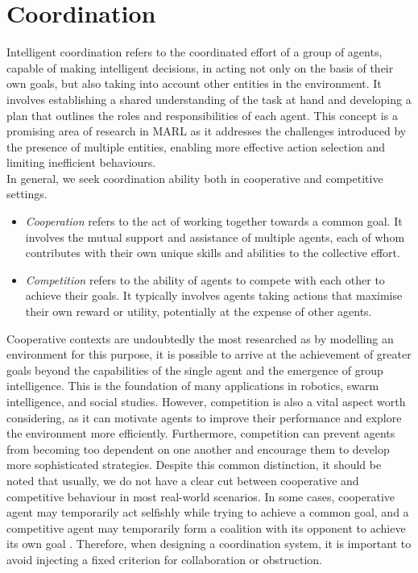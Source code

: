 \documentclass[a4paper,singleside,12pt]{report} %
\begin{document}
\section{Coordination}\label{coordination}

Intelligent coordination refers to the coordinated effort of a group of agents, capable of making intelligent decisions, in acting not only on the basis of their own goals, but also taking into account other entities in the environment. It involves establishing a shared understanding of the task at hand and developing a plan that outlines the roles and responsibilities of each agent. This concept is a promising area of research in MARL as it addresses the challenges introduced by the presence of multiple entities, enabling more effective action selection and limiting inefficient behaviours.\\
In general, we seek coordination ability both in cooperative and competitive settings.

\begin{itemize}
    \item \textit{Cooperation} refers to the act of working together towards a common goal. It involves the mutual support and assistance of multiple agents, each of whom contributes with their own unique skills and abilities to the collective effort.
    \item \textit{Competition} refers to the ability of agents to compete with each other to achieve their goals. It typically involves agents taking actions that maximise their own reward or utility, potentially at the expense of other agents.
\end{itemize}

Cooperative contexts are undoubtedly the most researched \cite{Cao2012AnOO} as by modelling an environment for this purpose, it is possible to arrive at the achievement of greater goals beyond the capabilities of the single agent and the emergence of group intelligence. This is the foundation of many applications in robotics, swarm intelligence, and social studies. However, competition is also a vital aspect worth considering, as it can motivate agents to improve their performance and explore the environment more efficiently. Furthermore, competition can prevent agents from becoming too dependent on one another and encourage them to develop more sophisticated strategies. Despite this common distinction, it should be noted that usually, we do not have a clear cut between cooperative and competitive behaviour in most real-world scenarios. In some cases, cooperative agent may temporarily act selfishly while trying to achieve a common goal, and a competitive agent may temporarily form a coalition with its opponent to achieve its own goal \cite{Buoniu2008ACS, Hoen2005AnOO}. Therefore, when designing a coordination system, it is important to avoid injecting a fixed criterion for collaboration or obstruction.
\end{document}
